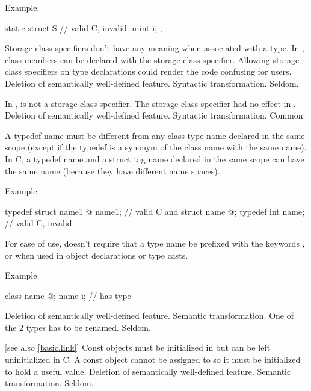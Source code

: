Example:
\begin{codeblock}
static struct S {               // valid C, invalid in \Cpp{}
  int i;
};
\end{codeblock}

\rationale
Storage class specifiers don't have any meaning when associated
with a type.
In \Cpp{}, class members can be declared with the  storage
class specifier.
Allowing storage class specifiers on type
declarations could render the code confusing for users.
\effect
Deletion of semantically well-defined feature.
\difficulty
Syntactic transformation.
\howwide
Seldom.

\change
In \Cpp{},  is not a storage class specifier.
\rationale
The storage class specifier had no effect in \Cpp{}.
\effect
Deletion of semantically well-defined feature.
\difficulty
Syntactic transformation.
\howwide
Common.

\change
A \Cpp{} typedef name must be different from any class type name declared
in the same scope (except if the typedef is a synonym of the class name with the
same name). In C, a typedef name and a struct tag name declared in the same scope
can have the same name (because they have different name spaces).

Example:
\begin{codeblock}
typedef struct name1 { @\commentellip@ } name1;         // valid C and \Cpp{}
struct name { @\commentellip@ };
typedef int name;               // valid C, invalid \Cpp{}
\end{codeblock}

\rationale
For ease of use, \Cpp{} doesn't require that a type name be prefixed
with the keywords ,  or  when used in object
declarations or type casts.

Example:
\begin{codeblock}
class name { @\commentellip@ };
name i;                         //  has type 
\end{codeblock}

\effect
Deletion of semantically well-defined feature.
\difficulty
Semantic transformation.
One of the 2 types has to be renamed.
\howwide
Seldom.

 [see also \ref{basic.link}]
\change
Const objects must be initialized in \Cpp{} but can be left uninitialized in C.
\rationale
A const object cannot be assigned to so it must be initialized
to hold a useful value.
\effect
Deletion of semantically well-defined feature.
\difficulty
Semantic transformation.
\howwide
Seldom.

